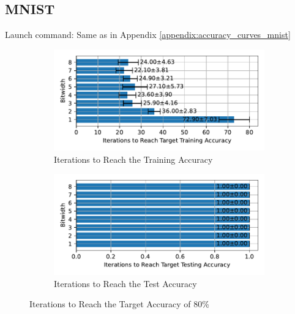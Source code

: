     \subsection{MNIST}
    \label{appendix:iterations_mnist}
        Launch command: Same as in Appendix \ref{appendix:accuracy_curves_mnist}
        \begin{figure}[H]
            \centering
            \begin{subfigure}[H]{0.6\textwidth}
                \centering
                \includegraphics[width=\textwidth]{../standard/MNIST/plots/mnist_train_iters_horizontal.pdf}
                \caption{Iterations to Reach the Training Accuracy}
            \end{subfigure}
            \hfill
            \begin{subfigure}[H]{0.6\textwidth}
                \centering
                \includegraphics[width=\textwidth]{../standard/MNIST/plots/mnist_test_iters_horizontal.pdf}
                \caption{Iterations to Reach the Test Accuracy}
            \end{subfigure}
            \caption{Iterations to Reach the Target Accuracy of 80\%}
        \end{figure}

